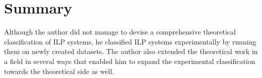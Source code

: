 \section{Summary}
Although the author did not manage to devise a comprehensive theoretical classification of ILP systems, he classified ILP systems experimentally by running them on newly created datasets. The author also extended the theoretical work in a field in several ways that enabled him to expand the experimental classification towards the theoretical side as well.